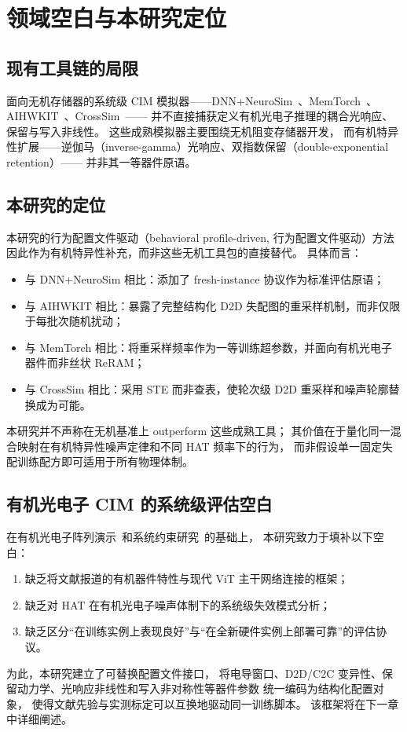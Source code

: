 \section{领域空白与本研究定位}

\subsection{现有工具链的局限}

面向无机存储器的系统级 CIM 模拟器——DNN+NeuroSim~\citep{peng2020dnnneurosim}、MemTorch~\citep{lammie2022memtorch}、AIHWKIT~\citep{rasch2021aihwkit}、CrossSim~\citep{crosssim2024}——
并不直接捕获定义有机光电子推理的耦合光响应、保留与写入非线性。
这些成熟模拟器主要围绕无机阻变存储器开发，
而有机特异性扩展——逆伽马（inverse-gamma）光响应、双指数保留（double-exponential retention）——
并非其一等器件原语。

\subsection{本研究的定位}

本研究的行为配置文件驱动（behavioral profile-driven, 行为配置文件驱动）方法因此作为有机特异性补充，而非这些无机工具包的直接替代。
具体而言：
\begin{itemize}
    \item 与 DNN+NeuroSim 相比：添加了 fresh-instance 协议作为标准评估原语；
    \item 与 AIHWKIT 相比：暴露了完整结构化 D2D 失配图的重采样机制，而非仅限于每批次随机扰动；
    \item 与 MemTorch 相比：将重采样频率作为一等训练超参数，并面向有机光电子器件而非丝状 ReRAM；
    \item 与 CrossSim 相比：采用 STE 而非查表，使轮次级 D2D 重采样和噪声轮廓替换成为可能。
\end{itemize}

本研究并不声称在无机基准上 outperform 这些成熟工具；
其价值在于量化同一混合映射在有机特异性噪声定律和不同 HAT 频率下的行为，
而非假设单一固定失配训练配方即可适用于所有物理体制。

\subsection{有机光电子 CIM 的系统级评估空白}

在有机光电子阵列演示~\citep{gebregiorgis2023organiccim,zhang2025opect,zhang2025mooptoelectronic,cui2025multimode}和系统约束研究~\citep{visionarch2023crosstalk,amspa2024insensor,jang2023insensor,fuller2020tempresilient,guo2024hightemp}的基础上，
本研究致力于填补以下空白：
\begin{enumerate}
    \item 缺乏将文献报道的有机器件特性与现代 ViT 主干网络连接的框架；
    \item 缺乏对 HAT 在有机光电子噪声体制下的系统级失效模式分析；
    \item 缺乏区分``在训练实例上表现良好''与``在全新硬件实例上部署可靠''的评估协议。
\end{enumerate}

为此，本研究建立了可替换配置文件接口，
将电导窗口、D2D/C2C 变异性、保留动力学、光响应非线性和写入非对称性等器件参数
统一编码为结构化配置对象，
使得文献先验与实测标定可以互换地驱动同一训练脚本。
该框架将在下一章中详细阐述。
